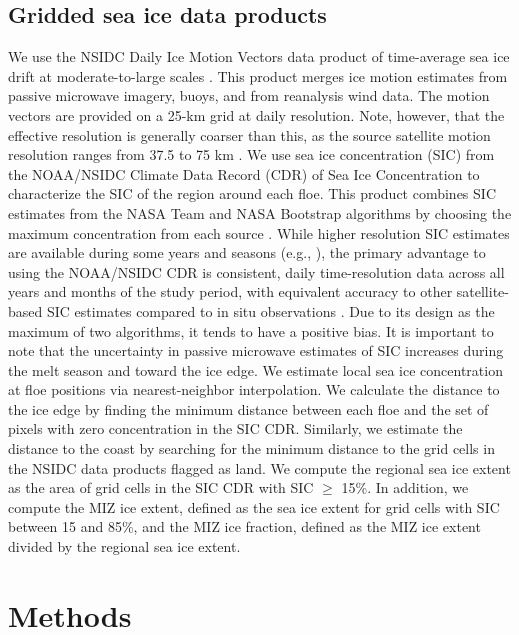 \documentclass[review, jog]{igs}
\begin{document}
\subsection{Gridded sea ice data products}
We use the NSIDC Daily Ice Motion Vectors data product of time-average sea ice drift at moderate-to-large scales \citep{tschudi2020_EnhancementSea}.
This product merges ice motion estimates from passive microwave imagery, buoys, and from reanalysis wind data.
The motion vectors are provided on a 25-km grid at daily resolution.
Note, however, that the effective resolution is generally coarser than this, as the source satellite motion resolution ranges from 37.5 to 75 km \citep{tschudi2020_EnhancementSea}. 
We use sea ice concentration (SIC) from the
{NOAA/NSIDC} Climate Data Record (CDR) of Sea Ice Concentration
to characterize the SIC of the region around each floe.
This product combines SIC estimates from the NASA Team and NASA Bootstrap algorithms by choosing the maximum concentration from each source \citep{meier2021_NOAANSIDC, meier2022}.
While higher resolution SIC estimates are available during some years and seasons (e.g., \cite{spreen2008}), the primary advantage to using the NOAA/NSIDC CDR is consistent, daily time-resolution data across all years and months of the study period, with equivalent accuracy to other satellite-based SIC estimates compared to in situ observations \citep{kern2019_SatellitePassive}.
Due to its design as the maximum of two algorithms, it tends to have a positive bias.
It is important to note that the uncertainty in passive microwave estimates of SIC increases during the melt season and toward the ice edge.
We estimate local sea ice concentration at floe positions via nearest-neighbor interpolation.
We calculate the distance to the ice edge by finding the minimum distance between each floe and the set of pixels with zero concentration in the SIC CDR. Similarly, we estimate the distance to the coast by searching for the minimum distance to the grid cells in the NSIDC data products flagged as land.
We compute the regional sea ice extent as the area of grid cells in the SIC CDR with SIC $\geq$ 15\%. 
In addition, we compute the MIZ ice extent, defined as the sea ice extent for grid cells with SIC between 15 and 85\%, and the MIZ ice fraction, defined as the MIZ ice extent divided by the regional sea ice extent.

\section{Methods}
\end{document}
